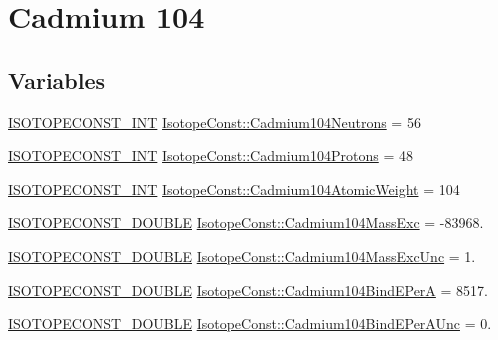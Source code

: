\hypertarget{group___isotope_const-_cadmium-_cd104}{}\section{Cadmium 104}
\label{group___isotope_const-_cadmium-_cd104}
\subsection*{Variables}
\begin{DoxyCompactItemize}
\item 
\mbox{\hyperlink{group___isotope_const-_macros_ga5f18360b3e99483a35c32d789e62621c}{I\+S\+O\+T\+O\+P\+E\+C\+O\+N\+S\+T\+\_\+\+I\+NT}} \mbox{\hyperlink{group___isotope_const-_cadmium-_cd104_ga0d98c6099de840109acdf2c2f9402ce1}{Isotope\+Const\+::\+Cadmium104\+Neutrons}} = 56
\item 
\mbox{\hyperlink{group___isotope_const-_macros_ga5f18360b3e99483a35c32d789e62621c}{I\+S\+O\+T\+O\+P\+E\+C\+O\+N\+S\+T\+\_\+\+I\+NT}} \mbox{\hyperlink{group___isotope_const-_cadmium-_cd104_gafbf789ef3010810710f014621dc96f15}{Isotope\+Const\+::\+Cadmium104\+Protons}} = 48
\item 
\mbox{\hyperlink{group___isotope_const-_macros_ga5f18360b3e99483a35c32d789e62621c}{I\+S\+O\+T\+O\+P\+E\+C\+O\+N\+S\+T\+\_\+\+I\+NT}} \mbox{\hyperlink{group___isotope_const-_cadmium-_cd104_ga9a59f7b147ce14a81d6d1b9c772d339d}{Isotope\+Const\+::\+Cadmium104\+Atomic\+Weight}} = 104
\item 
\mbox{\hyperlink{group___isotope_const-_macros_ga8f45a7272ce02c0b4c65c44636ed719a}{I\+S\+O\+T\+O\+P\+E\+C\+O\+N\+S\+T\+\_\+\+D\+O\+U\+B\+LE}} \mbox{\hyperlink{group___isotope_const-_cadmium-_cd104_ga137c6345a8a4d16707bd29d9aa292a5f}{Isotope\+Const\+::\+Cadmium104\+Mass\+Exc}} = -\/83968.
\item 
\mbox{\hyperlink{group___isotope_const-_macros_ga8f45a7272ce02c0b4c65c44636ed719a}{I\+S\+O\+T\+O\+P\+E\+C\+O\+N\+S\+T\+\_\+\+D\+O\+U\+B\+LE}} \mbox{\hyperlink{group___isotope_const-_cadmium-_cd104_ga449295925e4d21ca04f8814a890bc68e}{Isotope\+Const\+::\+Cadmium104\+Mass\+Exc\+Unc}} = 1.
\item 
\mbox{\hyperlink{group___isotope_const-_macros_ga8f45a7272ce02c0b4c65c44636ed719a}{I\+S\+O\+T\+O\+P\+E\+C\+O\+N\+S\+T\+\_\+\+D\+O\+U\+B\+LE}} \mbox{\hyperlink{group___isotope_const-_cadmium-_cd104_ga1ec22f4c3b894947c7c9734dfd6833ef}{Isotope\+Const\+::\+Cadmium104\+Bind\+E\+PerA}} = 8517.
\item 
\mbox{\hyperlink{group___isotope_const-_macros_ga8f45a7272ce02c0b4c65c44636ed719a}{I\+S\+O\+T\+O\+P\+E\+C\+O\+N\+S\+T\+\_\+\+D\+O\+U\+B\+LE}} \mbox{\hyperlink{group___isotope_const-_cadmium-_cd104_gab947a703dec26407a94c22408ac799e3}{Isotope\+Const\+::\+Cadmium104\+Bind\+E\+Per\+A\+Unc}} = 0.

\end{DoxyCompactItemize}
